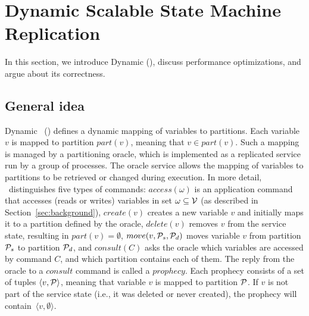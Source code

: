 \section{Dynamic Scalable State Machine Replication}

In this section, we introduce Dynamic \ssmr{} (\dssmr), discuss performance optimizations, and argue about its correctness.

\subsection{General idea}
\label{sec:generalidea}

%

Dynamic \ssmr\ (\dssmr) defines a dynamic mapping of variables to partitions.
Each variable $v$ is mapped to partition $part(v)$, meaning that $v \in part(v)$.
Such a mapping is managed by a partitioning oracle, which is implemented as a replicated service run by a group of processes.
The oracle service allows the mapping of variables to partitions to be retrieved or changed during execution.
In more detail, \dssmr\ distinguishes five types of commands:
$access(\omega)$ is an application command that accesses (reads or writes) variables in set $\omega \subseteq \mathcal{V}$ (as described in Section~\ref{sec:background}),
$create(v)$ creates a new variable $v$ and initially maps it to a partition defined by the oracle,
$delete(v)$ removes $v$ from the service state, resulting in $part(v) = \emptyset$,
$move(v,\mathcal{P}_s,\mathcal{P}_d)$ moves variable $v$ from partition $\mathcal{P}_s$ to partition $\mathcal{P}_d$,
and $consult(C)$ asks the oracle which variables are accessed by command $C$, and which partition contains each of them.
The reply from the oracle to a $consult$ command is called a $prophecy$.
Each prophecy consists of a set of tuples $\langle v, \mathcal{P} \rangle$, meaning that variable $v$ is mapped to partition $\mathcal{P}$.
If $v$ is not part of the service state (i.e., it was deleted or never created), the prophecy will contain~$\langle v, \emptyset \rangle$.

